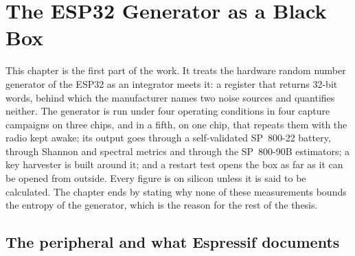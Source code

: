 \chapter{The ESP32 Generator as a Black Box}
\label{ch:esp32}


This chapter is the first part of the work. It treats the hardware random
number generator of the ESP32 as an integrator meets it: a register that
returns 32-bit words, behind which the manufacturer names two noise
sources and quantifies neither. The generator is run under four operating
conditions in four capture campaigns on three chips, and in a fifth, on
one chip, that repeats them with the radio kept awake; its output goes through a
self-validated SP~800-22 battery, through Shannon and spectral metrics
and through the SP~800-90B estimators; a key harvester is built around
it; and a restart test opens the box as far as it can be opened from
outside. Every figure is \meas{} on silicon unless it is said to be
calculated. The chapter ends by stating why none of these measurements
bounds the entropy of the generator, which is the reason for the rest of
the thesis.

\section{The peripheral and what Espressif documents}
\label{sec:esp32_periph}


